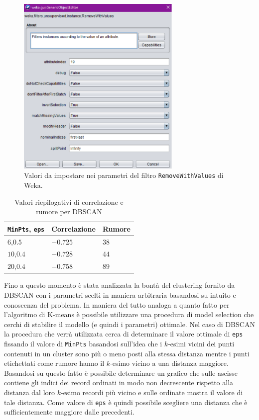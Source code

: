 \documentclass[12pt]{article}
\begin{document}
\begin{figure}[H]
\centering
	\includegraphics[width=0.7\textwidth]{img/filter-for-remove-noise.pdf}
	\caption{Valori da impostare nei parametri del filtro \texttt{RemoveWithValues} di Weka.}
	\label{fig:remove-noise}
\end{figure}

\begin{table}[H]
\centering
\begin{tabular}{@{}lll@{}}
\toprule	
\texttt{MinPts}, \texttt{eps} & Correlazione & Rumore \\ \hline
$6$,$0.5$       & $-0.725$  & $38$     \\ 
$10$,$0.4$      & $-0.728$  & $44$     \\ 
$20$,$0.4$      & $-0.758$  & $89$     \\ \bottomrule
\end{tabular}
\caption{Valori riepilogativi di correlazione e rumore per DBSCAN}
\label{tab:corr-noise-dbscan}
\end{table}

Fino a questo momento è stata analizzata la bontà del clustering fornito da DBSCAN con i parametri scelti in maniera arbitraria basandosi su intuito e conoscenza del problema. In maniera del tutto analoga a quanto fatto per l'algoritmo di K-means è possibile utilizzare una procedura di model selection che cerchi di stabilire il modello (e quindi i parametri) ottimale. Nel caso di DBSCAN la procedura che verrà utilizzata cerca di determinare il valore ottimale di \texttt{eps} fissando il valore di \texttt{MinPts} basandosi sull'idea che i $k$-esimi vicini dei punti contenuti in un cluster sono più o meno posti alla stessa distanza mentre i punti etichettati come rumore hanno il $k$-esimo vicino a una distanza maggiore. Basandosi su questo fatto è possibile determinare un grafico che sulle ascisse contiene gli indici dei record ordinati in modo non decrescente rispetto alla distanza dal loro $k$-esimo recordi più vicino e sulle ordinate mostra il valore di tale distanza. Come valore di \texttt{eps} è quindi possibile scegliere una distanza che è sufficientemente maggiore dalle precedenti.
\end{document}
